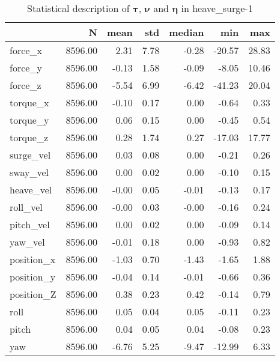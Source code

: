 \begin{table}[hb]
\centering
\caption{Statistical description of $\boldsymbol{\tau}$, $\boldsymbol{\nu}$ and $\boldsymbol{\eta}$ in heave_surge-1}
\label{tab:description-heave_surge-1}
\begin{tabular}{lrrrrrr}
\toprule
{} &       N &  mean &  std & median &    min &   max \\
\midrule
force\_x    & 8596.00 &  2.31 & 7.78 &  -0.28 & -20.57 & 28.83 \\
force\_y    & 8596.00 & -0.13 & 1.58 &  -0.09 &  -8.05 & 10.46 \\
force\_z    & 8596.00 & -5.54 & 6.99 &  -6.42 & -41.23 & 20.04 \\
torque\_x   & 8596.00 & -0.10 & 0.17 &   0.00 &  -0.64 &  0.33 \\
torque\_y   & 8596.00 &  0.06 & 0.15 &   0.00 &  -0.45 &  0.54 \\
torque\_z   & 8596.00 &  0.28 & 1.74 &   0.27 & -17.03 & 17.77 \\
surge\_vel  & 8596.00 &  0.03 & 0.08 &   0.00 &  -0.21 &  0.26 \\
sway\_vel   & 8596.00 &  0.00 & 0.02 &   0.00 &  -0.10 &  0.15 \\
heave\_vel  & 8596.00 & -0.00 & 0.05 &  -0.01 &  -0.13 &  0.17 \\
roll\_vel   & 8596.00 & -0.00 & 0.03 &  -0.00 &  -0.16 &  0.24 \\
pitch\_vel  & 8596.00 &  0.00 & 0.02 &   0.00 &  -0.09 &  0.14 \\
yaw\_vel    & 8596.00 & -0.01 & 0.18 &   0.00 &  -0.93 &  0.82 \\
position\_x & 8596.00 & -1.03 & 0.70 &  -1.43 &  -1.65 &  1.88 \\
position\_y & 8596.00 & -0.04 & 0.14 &  -0.01 &  -0.66 &  0.36 \\
position\_Z & 8596.00 &  0.38 & 0.23 &   0.42 &  -0.14 &  0.79 \\
roll       & 8596.00 &  0.05 & 0.04 &   0.05 &  -0.11 &  0.23 \\
pitch      & 8596.00 &  0.04 & 0.05 &   0.04 &  -0.08 &  0.23 \\
yaw        & 8596.00 & -6.76 & 5.25 &  -9.47 & -12.99 &  6.33 \\
\bottomrule
\end{tabular}
\end{table}
